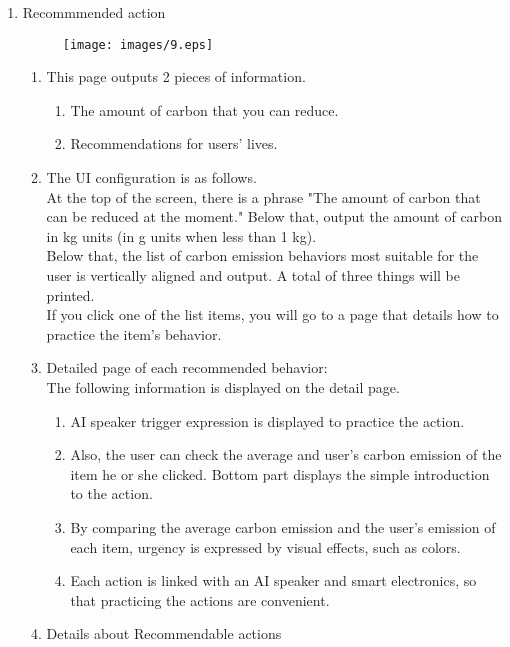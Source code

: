 \documentclass[11pt, conference]{IEEEtran}
\begin{document}
\begin{enumerate}[label=\arabic*]
    \item {\large{Recommmended action}}
    \begin{figure}[H]
            \centering
            \texttt{[image: images/9.eps]}
    \end{figure}
    \begin{enumerate}[label=\alph*]
        \item This page outputs 2 pieces of information.
        \begin{enumerate}
            \item The amount of carbon that you can reduce.
            \item Recommendations for users' lives.
        \end{enumerate}
        \item The UI configuration is as follows.\\
        At the top of the screen, there is a phrase "The amount of carbon that can be reduced at the moment." Below that, output the amount of carbon in kg units (in g units when less than 1 kg).\\
        Below that, the list of carbon emission behaviors most suitable for the user is vertically aligned and output. A total of three things will be printed.\\
        If you click one of the list items, you will go to a page that details how to practice the item's behavior.
        \item Detailed page of each recommended behavior:\\
        The following information is displayed on the detail page.
        \begin{enumerate}
            \item AI speaker trigger expression is displayed to practice the action.
            \item Also, the user can check the average and user's carbon emission of the item he or she clicked. Bottom part displays the simple introduction to the action.
            \item By comparing the average carbon emission and the user's emission of each item, urgency is expressed by visual effects, such as colors.
            \item Each action is linked with an AI speaker and smart electronics, so that practicing the actions are convenient.
        \end{enumerate}
        \item Details about Recommendable actions\\

\end{enumerate}
\end{enumerate}
\end{document}
